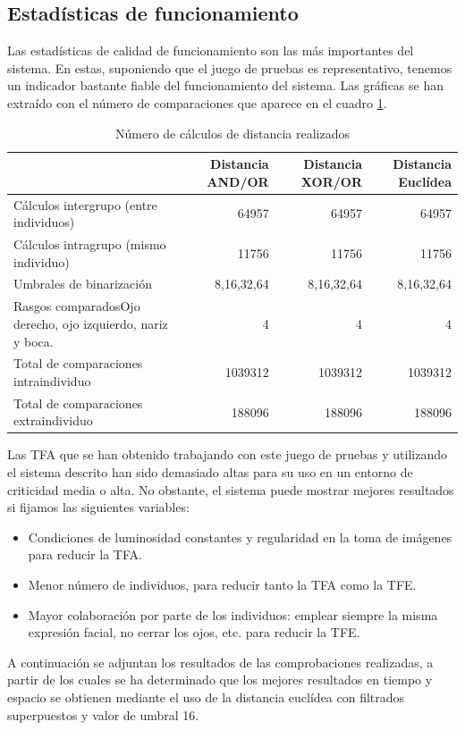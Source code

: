 \subsection{Estadísticas de funcionamiento}
Las estadísticas de calidad de funcionamiento son las más importantes del sistema. En estas, suponiendo que el juego de pruebas es representativo, tenemos un indicador bastante fiable del funcionamiento del sistema. Las gráficas se han extraído con el número de comparaciones que aparece en el cuadro \ref{tab:distance_calc_stats}.
\begin{table}[!hb]
	\begin{tabular}{|l|r|r|r|}
		\hline
		& Distancia AND/OR & Distancia XOR/OR & Distancia Euclídea \\
		\hline \hline
		Cálculos intergrupo (entre individuos) & 64957 & 64957 & 64957\\
		Cálculos intragrupo (mismo individuo) & 11756 & 11756 & 11756 \\
		Umbrales de binarización & 8,16,32,64 & 8,16,32,64 & 8,16,32,64 \\
		Rasgos comparados\tiny{Ojo derecho, ojo izquierdo, nariz y boca.} & 4 & 4 & 4 \\
		\hline
		Total de comparaciones intraindividuo & 1039312 & 1039312 & 1039312 \\
		Total de comparaciones extraindividuo & 188096 & 188096 & 188096 \\
		\hline
	\end{tabular}
	\caption{Número de cálculos de distancia realizados}
	\label{tab:distance_calc_stats}
\end{table}

Las TFA que se han obtenido trabajando con este juego de pruebas y utilizando el sistema descrito han sido demasiado altas para su uso en un entorno de criticidad media o alta. No obstante, el sistema puede mostrar mejores resultados si fijamos las siguientes variables:
\begin{itemize}
	\item{Condiciones de luminosidad constantes y regularidad en la toma de imágenes para reducir la TFA.}
	\item{Menor número de individuos, para reducir tanto la TFA como la TFE.}
	\item{Mayor colaboración por parte de los individuos: emplear siempre la misma expresión facial, no cerrar los ojos, etc. para reducir la TFE.}
\end{itemize}
A continuación se adjuntan los resultados de las comprobaciones realizadas, a partir de los cuales se ha determinado que los mejores resultados en tiempo y espacio se obtienen mediante el uso de la distancia euclídea con filtrados superpuestos y valor de umbral 16.


